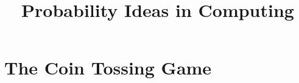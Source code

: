 \documentclass{book}
\title{Probability Ideas in Computing}
\begin{document}
\chapter{The Coin Tossing Game}

\begin{comment}
We start this chapter with a coin tossing game, left incomplete in the previous chapter. We toss a coin $100$ times and want to calculate the expected number of times head turns up. We have discussed the notion of random variables in the previous chapter. We will be using the same notion for solving this problem. It can be done in two ways as discussed below.

\subsection{Case 1}
Let $X$ be a random variable which denotes the number of times head appears when we toss the coin $100$ times. We know that the range of numbers $X$ can take values from is $\{0, 1, 2, ..., 99, 100\}$. We also know that $E[X]= \sum_{i=0}^{100} i P(i)$, where $P(i)$ is the probability of getting $i$ heads when the coin is tossed $100$ times. A basic knowledge of probabiility and combinatorics tell us that $P(i) = \binom{100}{i} {(\frac{1}{2})}^i$. Hence, $E[X]= \sum_{i=0}^{100} i P(i) = 0 \binom{100}{0} {(\frac{1}{2})}^0 + 1 \binom{100}{1} {(\frac{1}{2})}^1 + ... + 100 \binom{100}{100} {(\frac{1}{2})}^{100} $. Solving this complicated equation gives us the answer $E[X]=50$. However, there is another easier way of finding $E[X]$ with the help of indicator random variables. 

An indicator random variable is a binary random variable which takes only two values $0$ and $1$. We can model the above problem in a similar way using the concept of indicator random variables. We associate an indicator random variable $Y_i$ with each coin toss. The first coin toss is associated with $Y_1$, second with $Y_2$, so on and so forth.  
\[
Y_i = \left\{\def\arraystretch{1.2}%
\begin{array}{@{}c@{\quad}l@{}}
1 & \text{if the coin shows up head in $i_{th}$ coin toss}\\
0 & \text{if the coin shows up tail}\\
\end{array}\right.
\]\\
\end{comment}
\end{document}
